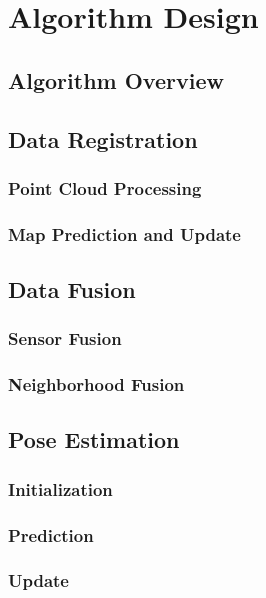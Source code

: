 \label{Chapter2}

\chapter{Algorithm Design}

\section{Algorithm Overview}

\section{Data Registration}

\subsection{Point Cloud Processing}

\subsection{Map Prediction and Update}

\section{Data Fusion}

\subsection{Sensor Fusion}

\subsection{Neighborhood Fusion}

\section{Pose Estimation}

\subsection{Initialization}

\subsection{Prediction}

\subsection{Update}

